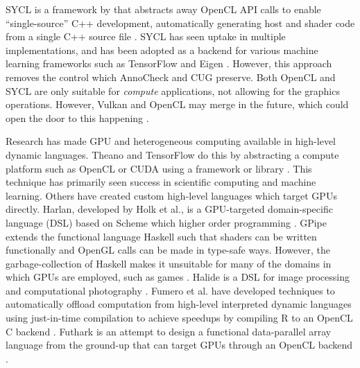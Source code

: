 \documentclass[a4paper,12pt,twoside,openright]{report}
\begin{document}
SYCL is a framework by that abstracts away OpenCL API calls to enable
``single-source'' C++ development, automatically generating host and shader
code from a single C++ source file \cite{OpenCL22Release} \cite{SYCL}. SYCL has
seen uptake in multiple implementations, and has been adopted as a backend for
various machine learning frameworks such as TensorFlow and Eigen
\cite{ComputeCPP} \cite{triSYCL} \cite{SYCLTensorFlow} \cite{SYCLEigen}.
However, this approach removes the control which AnnoCheck and CUG preserve.
Both OpenCL and SYCL are only suitable for \textit{compute} applications, not
allowing for the graphics operations. However, Vulkan and OpenCL may merge in
the future, which could open the door to this happening
\cite{VulkanOpenCLMerge}.

Research has made GPU and heterogeneous computing available in high-level
dynamic languages. Theano and TensorFlow do this by abstracting a compute
platform such as OpenCL or CUDA using a framework or library \cite{Theano2016}
\cite{TensorFlowWhitePaper}. This technique has primarily seen success in
scientific computing and machine learning. Others have created custom
high-level languages which target GPUs directly. Harlan, developed by Holk et
al., is a GPU-targeted domain-specific language (DSL) based on Scheme which
higher order programming \cite{Harlan} \cite{HarlanAnnouncement}. GPipe extends
the functional language Haskell such that shaders can be written functionally
and OpenGL calls can be made in type-safe ways. However, the garbage-collection
of Haskell makes it unsuitable for many of the domains in which GPUs are
employed, such as games \cite{HaskellState} \cite{GPipe}. Halide is a DSL for
image processing and computational photography \cite{Halide}. Fumero et al.
have developed techniques to automatically offload computation from high-level
interpreted dynamic languages using just-in-time compilation to achieve
speedups by compiling R to an OpenCL C backend \cite{JITGPU}. Futhark is an
attempt to design a functional data-parallel array language from the ground-up
that can target GPUs through an OpenCL backend \cite{Futhark}.
\end{document}
